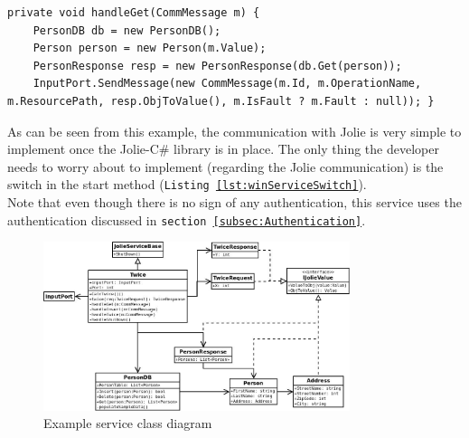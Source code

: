 \documentclass[12pt,a4paper]{article}
\begin{document}
\begin{lstlisting}[caption={Handle get method},label={lst:handleGet}]
private void handleGet(CommMessage m) {                                                                                                                                                                                                    
	PersonDB db = new PersonDB();                                                                                                                                                                    
	Person person = new Person(m.Value);                                                                                                                                                             
	PersonResponse resp = new PersonResponse(db.Get(person));                                                                                                                                        
	InputPort.SendMessage(new CommMessage(m.Id, m.OperationName, m.ResourcePath, resp.ObjToValue(), m.IsFault ? m.Fault : null)); }
\end{lstlisting}

As can be seen from this example, the communication with Jolie is very simple to implement once the Jolie-C\# library is in place. The only thing the developer needs to worry about to implement (regarding the Jolie communication) is the switch in the start method (\texttt{Listing \ref{lst:winServiceSwitch}}).\\
Note that even though there is no sign of any authentication, this service uses the authentication discussed in \texttt{section \ref{subsec:Authentication}}. 

\begin{figure}[h!]
  \centering
    \includegraphics[width=0.8\textwidth]{../figures/exampleServiceClassDiagram.jpeg}
  \caption{Example service class diagram}
  \label{fig:exampleServiceClassDiagram}
\end{figure}
\end{document}
